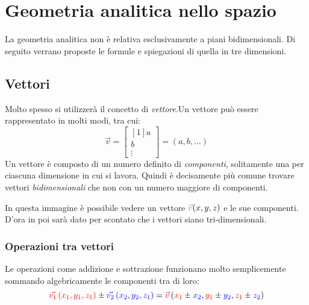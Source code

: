 
\section{Geometria analitica nello spazio}
La geometria analitica non è relativa esclusivamente a piani bidimensionali. Di seguito verrano 
proposte le formule e spiegazioni di quella in tre dimensioni.
\subsection{Vettori}
Molto spesso si utilizzerà il concetto di \emph{vettore}.Un vettore può essere rappresentato in 
molti modi, tra cui:
\begin{equation*}
  \vec{v} = 
  \begin{bmatrix}[1]
    a\\b\\\vdots
  \end{bmatrix} = 
  (a, b, \dots)
\end{equation*}
Un vettore è composto di un numero definito di \emph{componenti}, solitamente una per ciascuna
dimensione in cui si lavora. Quindi è decisamente più comune trovare vettori \emph{bidimensionali}
che non con un numero maggiore di componenti.
\begin{center}
\end{center}
In questa immagine è possibile vedere un vettore $\mathcolor{cyan}{\vec{v}}(x,y,z)$ e le sue 
componenti.\\[\baselineskip]
D'ora in poi sarà dato per scontato che i vettori siano tri-dimensionali.

\subsubsection{Operazioni tra vettori}
Le operazioni come addizione e sottrazione funzionano molto semplicemente sommando algebricamente
le componenti tra di loro:
\begin{equation*}
  \mathcolor{red}{\vec{v_1}\left(x_1, y_1, z_1\right)} \pm 
  \mathcolor{blue}{\vec{v_2}\left(x_2, y_2, z_1\right)} = 
  \mathcolor{purple}{\vec{v}}\left(\mathcolor{red}{x_1}\pm \mathcolor{blue}{x_2}, 
  \mathcolor{red}{y_1}\pm \mathcolor{blue}{y_2},
  \mathcolor{red}{z_1}\pm \mathcolor{blue}{z_2}\right)
\end{equation*}

